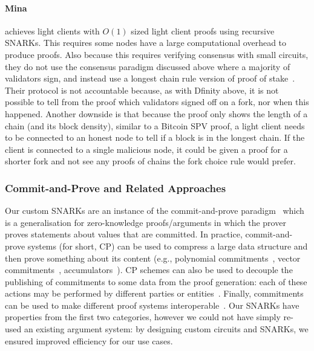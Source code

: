 \paragraph{Mina} achieves light clients with $O(1)$ sized light client proofs using recursive SNARKs. This requires some nodes have a large computational overhead to produce proofs. Also because this requires verifying consensus with small circuits, they do not use the consensus paradigm 
discussed above where a majority of validators sign, and instead use a longest chain rule version of proof of stake~\cite{mina}. 
Their protocol is not accountable because, as with Dfinity above, it is not possible to tell from the proof which validators signed off on a fork, nor when this happened. 
Another downside is that because the proof only shows the length of a chain (and its block density), similar to a Bitcoin SPV proof, a light client needs to be connected to an 
honest node to tell if a block is in the longest chain. If the client is connected to a single malicious node, it could be given a proof for a shorter fork and not see any proofs of chains the fork choice rule would prefer.
\vspace{-0.03cm}
\subsubsection{Commit-and-Prove and Related Approaches}
\label{sec:commit_prove}

\noindent Our custom SNARKs are an instance of the commit-and-prove paradigm~\cite{KilianPhD,CLOS02,CP_proposal,HP_paper} 
which is a generalisation for zero-knowledge proofs/arguments in which the prover proves statements about values that are committed. 
In practice, commit-and-prove systems (for short, CP) can be used to compress a large data structure and then prove something about its content 
(e.g., polynomial commitments~\cite{KZG_10}, vector commitments~\cite{vector_commitment_1}, accumulators~\cite{first_accumulator}). CP schemes can also be used to decouple the publishing of commitments to some data from the proof generation: each of these actions may be performed by different parties or entities~\cite{zkp_reference}. Finally, commitments can be used to make different proof systems interoperable~\cite{CP_paper,interoperability_2}. Our SNARKs have properties from the first two categories, however we could not have simply re-used an existing argument system: by 
designing custom circuits and SNARKs, we ensured improved efficiency for our use cases. \\
\vspace{-0.1in}

